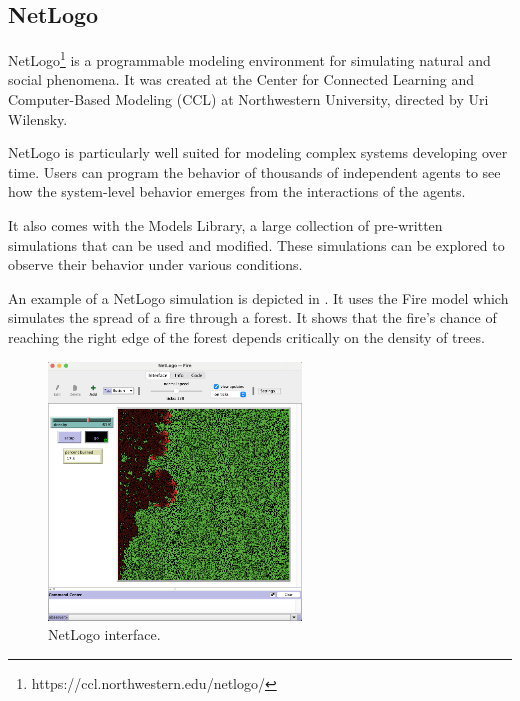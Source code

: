 \documentclass[12pt,a4paper,openright,twoside]{book}
\begin{document}
\subsection{NetLogo}

NetLogo\footnote{https://ccl.northwestern.edu/netlogo/} is a programmable modeling environment for simulating natural and social phenomena. It was created at the Center
for Connected Learning and Computer-Based Modeling (CCL) at Northwestern University, directed by Uri Wilensky.

NetLogo is particularly well suited for modeling complex systems developing over time.
Users can program the behavior of thousands of independent agents to see how the system-level behavior emerges from the interactions of the agents.

It also comes with the Models Library, a large collection of pre-written simulations that can be used and modified.
These simulations can be explored to observe their behavior under various conditions.

An example of a NetLogo simulation is depicted in .
It uses the Fire model which simulates the spread of a fire through a forest. 
It shows that the fire's chance of reaching the right edge of the forest depends critically on the density of trees.

\begin{figure}[h!]
  \centering
  \includegraphics[width=0.6\textwidth]{figures/NetLogo-interface.png}
  \caption{NetLogo interface.}
  \label{fig:netlogo-simulation}
\end{figure}
\end{document}
